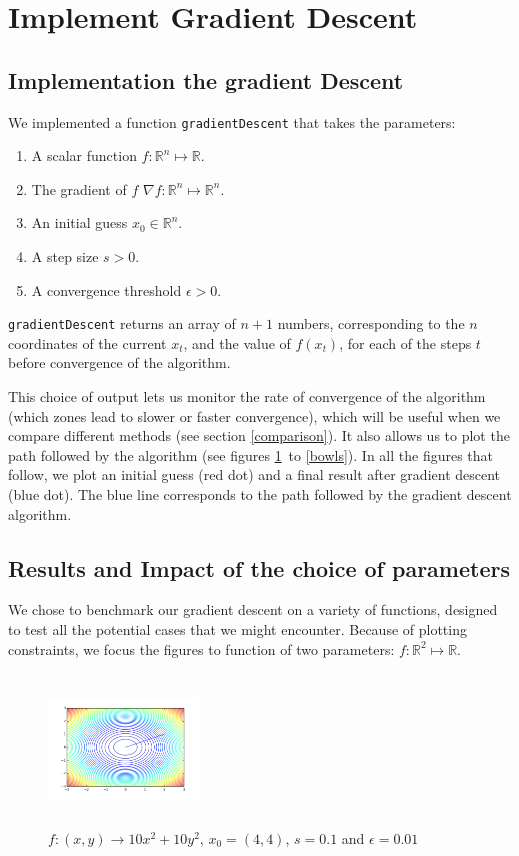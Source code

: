 \section{Implement Gradient Descent}
\subsection{Implementation the gradient Descent}
We implemented a function {\tt gradientDescent}  that takes the parameters:
\begin{enumerate}[-]
\item A scalar function $f: \mathbb{R}^n \mapsto \mathbb{R}$.
\item The gradient of $f$ $\nabla f: \mathbb{R}^n \mapsto \mathbb{R}^n$.
\item An initial guess $x_0 \in \mathbb{R}^n$.
\item A step size $s > 0$.
\item A convergence threshold $\epsilon > 0$.
\end{enumerate}
 {\tt gradientDescent} returns an array of $n+1$ numbers, corresponding to the $n$ coordinates of the current $x_t$, and the value of $f(x_t)$, for each of the steps $t$ before convergence of the algorithm.
 
 This choice of output lets us monitor the rate of convergence of the algorithm (which zones lead to slower or faster convergence), which will be useful when we compare different methods (see section \ref{comparison}). It also allows us to plot the path followed by the algorithm (see figures \ref{bowl} to \ref{bowls}). In all the figures that follow, we plot an initial guess (red dot) and a final result after gradient descent (blue dot). The blue line corresponds to the path followed by the gradient descent algorithm.

\subsection{Results and Impact of the choice of parameters}

We chose to benchmark our gradient descent on a variety of functions, designed to test all the potential cases that we might encounter. Because of plotting constraints, we focus the figures to function of two parameters:  $f: \mathbb{R}^2 \mapsto \mathbb{R}$.

\begin{figure}[h]
  \centering
 \includegraphics[width=4cm, height= 4cm]{../Figures/Q1/bowl.png}
\caption{$f : (x,y) \to 10x^2 + 10y^2$, $x_0 = (4,4)$, $s = 0.1$ and $\epsilon = 0.01$}
\label{bowl}
\end{figure}

